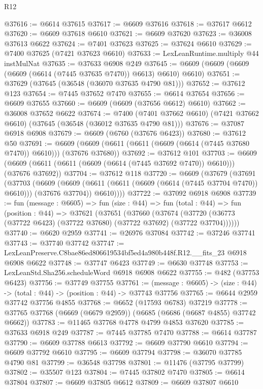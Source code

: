 \begin{lexlean}{R12}
\begin{coremodule}
@37616 := @6614 @37615
@37617 := @6609 @37616
@37618 := @37617 @6612
@37620 := @6609 @37618 @6610
@37621 := @6609 @37620
@37623 := @36008 @37613 @6622
@37624 := @7401 @37623
@37625 := @37624 @6610
@37629 := @7400 @37625 (@7421 @37623 @6610)
@37633 := LexLeanRuntime.multiply @44 instMulNat
@37635 := @37633 @6908 @249
@37645 := @6609 (@6609 (@6609 (@6609 (@6614 (@7445 @37635 @7470)) @6613) @6610) @6610)
@37651 := @37629 (@37645 (@36548 (@36070 @37635 @4790 @81)))
@37652 := @37612 @123
@37654 := @7445 @37652 @7470
@37655 := @6614 @37654
@37656 := @6609 @37655
@37660 := @6609 (@6609 (@37656 @6612) @6610)
@37662 := @36008 @37652 @6622
@37674 := @7400
    (@7401 @37662 @6610)
    (@7421 @37662 @6610)
    (@37645 (@36548 (@36012 @37635 @4790 @81)))
@37676 := @37087 @6918 @6908
@37679 := @6609 (@6760 (@37676 @6423))
@37680 := @37612 @50
@37691 := @6609 (@6609 (@6611 (@6611 (@6609 (@6614 (@7445 @37680 @7470)) @6610))) (@37676 @37680))
@37692 := @37612 @101
@37703 := @6609 (@6609 (@6611 (@6611 (@6609 (@6614 (@7445 @37692 @7470)) @6610))) (@37676 @37692))
@37704 := @37612 @118
@37720 := @6609
    (@37679
      (@37691
        (@37703
          (@6609
            (@6609 (@6611 (@6611 (@6609 (@6614 (@7445 @37704 @7470)) @6610))) (@37676 @37704))
            @6610))))
@37722 := @37092 @6918 @6908
@37739 := fun (message : @6605) =>
  fun (size : @44) =>
  fun (total : @44) =>
  fun (position : @44) =>
  @37621
    (@37651
      (@37660
        (@37674 (@37720 (@36773 (@37722 @6423) (@37722 @37680) (@37722 @37692) (@37722 @37704))))))
@37740 := @6620 @2959
@37741 := @26976 @37084
@37742 := @37246 @37741
@37743 := @37740 @37742
@37747 := LexLeanPreserve.C8bae86ed806619534bf5ed4a980b448f.R12.__fits_23 @6918 @6908 @6622
@37748 := @37747 @6423
@37749 := @6630 @37748
@37753 := LexLeanStd.Sha256.scheduleWord @6918 @6908 @6622
@37755 := @482 (@37753 @6423)
@37756 := @37749 @37755
@37761 := (message : @6605) -> (size : @44) -> (total : @44) -> (position : @44) -> @37743 @37756
@37765 := @6644 @2959 @37742 @37756 @4855
@37768 := @6652 (@17593 @6783) @37219
@37778 := @37765 @37768 (@6669 (@6679 @2959)) (@6685 (@6686 (@6687 @4855) @37742 @6662))
@37783 := @11465 @37768 @4778 @4799 @4853 @37620
@37785 := @37633 @6918 @249
@37787 := @7445 @37785 @7470
@37788 := @6614 @37787
@37790 := @6609 @37788 @6613
@37792 := @6609 @37790 @6610
@37794 := @6609 @37792 @6610
@37795 := @6609 @37794
@37798 := @36070 @37785 @4790 @81
@37799 := @36548 @37798
@37801 := @11476 (@37795 @37799)
@37802 := @35507 @123
@37804 := @7445 @37802 @7470
@37805 := @6614 @37804
@37807 := @6609 @37805 @6612
@37809 := @6609 @37807 @6610

\end{coremodule}
\end{lexlean}
